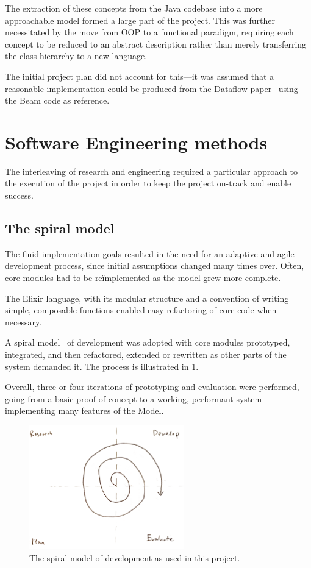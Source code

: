 The extraction of these concepts from the Java codebase into a more approachable model formed a large part of the project.
This was further necessitated by the move from OOP to a functional paradigm, requiring each concept to be reduced to an abstract description rather than merely transferring the class hierarchy to a new language.

The initial project plan did not account for this---it was assumed that a reasonable implementation could be produced from the Dataflow paper~\cite{Akidau:2015} using the Beam code as reference.

\section{Software Engineering methods}\label{sec:prep:softeng}

The interleaving of research and engineering required a particular approach to the execution of the project in order to keep the project on-track and enable success.

\subsection{The spiral model}\label{sec:prep:softeng:spiral}

The fluid implementation goals resulted in the need for an adaptive and agile development process, since initial assumptions changed many times over.
Often, core modules had to be re\"implemented as the model grew more complete.

The Elixir language, with its modular structure and a convention of writing simple, composable functions enabled easy refactoring of core code when necessary.

A spiral model~\cite{Boehm:1986} of development was adopted with core modules prototyped, integrated, and then refactored, extended or rewritten as other parts of the system demanded it.
The process is illustrated in \cref{fig:prep:spiral-model}.

Overall, three or four iterations of prototyping and evaluation were performed, going from a basic proof-of-concept to a working, performant system implementing many features of the Model.

\begin{figure}
	\centering
	\includegraphics[width=0.6\textwidth]{images/temp/spiral}
	\caption{The spiral model of development as used in this project.}
	\label{fig:prep:spiral-model}
\end{figure}



